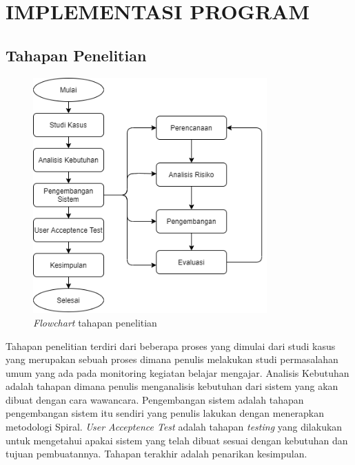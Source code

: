 
\chapter{IMPLEMENTASI PROGRAM}


\section{Tahapan Penelitian}

\begin{figure}[H]
	\centering
	\includegraphics[width=0.8\textwidth]{gambar/diagram/flowchart}
	\caption{\textit{Flowchart} tahapan penelitian}
	\label{fig:flow}
\end{figure}

Tahapan penelitian terdiri dari beberapa proses yang dimulai dari studi kasus yang merupakan sebuah proses dimana penulis melakukan studi permasalahan umum yang ada pada monitoring kegiatan belajar mengajar. Analisis Kebutuhan adalah tahapan dimana penulis menganalisis kebutuhan dari sistem yang akan dibuat dengan cara wawancara. Pengembangan sistem adalah tahapan pengembangan sistem itu sendiri yang penulis lakukan dengan menerapkan metodologi Spiral. \textit{User Acceptence Test} adalah tahapan \textit{testing} yang dilakukan untuk mengetahui apakai sistem yang telah dibuat sesuai dengan kebutuhan dan tujuan pembuatannya. Tahapan terakhir adalah penarikan kesimpulan.

